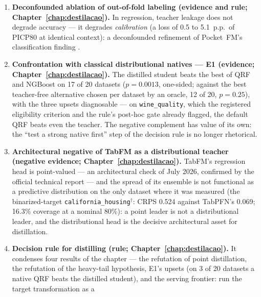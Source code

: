 \begin{enumerate}
\begin{enumerate}
    native QRF also inhabits the regime); where a single-member
    teacher already reaches the student's tier, shrinking the
    ensemble suffices. Two engineering side findings: one TabPFN
    member $\approx$ eight at a seventh of the latency, and the
    last context doubling is disproportionately expensive on 16~GB
    GPUs.
  \item \textbf{Deconfounded ablation of out-of-fold labeling
    (evidence and rule; Chapter~\ref{chap:destilacao}).} In
    regression, teacher leakage does not degrade accuracy --- it
    degrades \emph{calibration} (a loss of 0.5 to 5.1~p.p.\ of
    PICP80 at identical context): a deconfounded refinement of
    Pocket~FM's classification finding \citep{pocketfm2026}.
  \item \textbf{Confrontation with classical distributional
    natives --- E1 (evidence; Chapter~\ref{chap:destilacao}).} The
    distilled student beats the best of QRF and NGBoost on 17 of 20
    datasets ($p=0.0013$, one-sided; against the best teacher-free
    alternative chosen per dataset by an oracle, 12 of 20,
    $p=0.25$), with the three upsets
    diagnosable --- on \texttt{wine\_quality}, which the registered
    eligibility criterion and the rule's post-hoc gate already
    flagged, the
    default QRF beats even the teacher. The negative complement has
    value of its own: the ``test a strong native first'' step of
    the decision rule is no longer rhetorical.
  \item \textbf{Architectural negative of TabFM as a distributional
    teacher (negative evidence; Chapter~\ref{chap:destilacao}).}
    TabFM's regression head is point-valued --- an architectural
    check of July 2026, confirmed by the official technical report
    \citep{kong2026} --- and the spread of its ensemble is
    not functional as a predictive distribution on the only dataset
    where it was measured (the binarized-target
    \texttt{california\_housing}$^\dagger$: CRPS 0.524
    against TabPFN's 0.069; 16.3\% coverage at a nominal 80\%): a
    point leader is not a distributional leader, and the
    distributional head is the decisive architectural asset for
    distillation.
  \item \textbf{Decision rule for distilling (rule;
    Chapter~\ref{chap:destilacao}).} It condenses four results of
    the chapter --- the refutation of point distillation, the
    refutation of the heavy-tail hypothesis, E1's upsets (on 3 of 20
    datasets a native QRF beats the distilled student), and the
    serving frontier: run the target transformation as a

\end{enumerate}
\end{enumerate}
